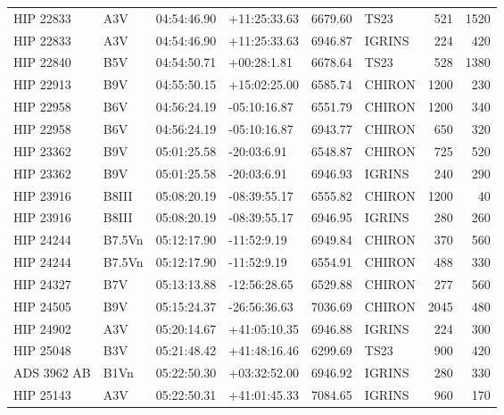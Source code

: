 \documentclass{emulateapj}
\begin{document}
\begin{longtable*}{|l|lllrlrr|}
   HIP 22833 &            A3V &    04:54:46.90 &   +11:25:33.63 &  6679.60 &       TS23 &      521 &    1520 \\
   HIP 22833 &            A3V &    04:54:46.90 &   +11:25:33.63 &  6946.87 &     IGRINS &      224 &     420 \\
   HIP 22840 &            B5V &    04:54:50.71 &    +00:28:1.81 &  6678.64 &       TS23 &      528 &    1380 \\
   HIP 22913 &            B9V &    04:55:50.15 &   +15:02:25.00 &  6585.74 &     CHIRON &     1200 &     230 \\
   HIP 22958 &            B6V &    04:56:24.19 &   -05:10:16.87 &  6551.79 &     CHIRON &     1200 &     340 \\
   HIP 22958 &            B6V &    04:56:24.19 &   -05:10:16.87 &  6943.77 &     CHIRON &      650 &     320 \\
   HIP 23362 &            B9V &    05:01:25.58 &    -20:03:6.91 &  6548.87 &     CHIRON &      725 &     520 \\
   HIP 23362 &            B9V &    05:01:25.58 &    -20:03:6.91 &  6946.93 &     IGRINS &      240 &     290 \\
   HIP 23916 &          B8III &    05:08:20.19 &   -08:39:55.17 &  6555.82 &     CHIRON &     1200 &      40 \\
   HIP 23916 &          B8III &    05:08:20.19 &   -08:39:55.17 &  6946.95 &     IGRINS &      280 &     260 \\
   HIP 24244 &         B7.5Vn &    05:12:17.90 &    -11:52:9.19 &  6949.84 &     CHIRON &      370 &     560 \\
   HIP 24244 &         B7.5Vn &    05:12:17.90 &    -11:52:9.19 &  6554.91 &     CHIRON &      488 &     330 \\
   HIP 24327 &            B7V &    05:13:13.88 &   -12:56:28.65 &  6529.88 &     CHIRON &      277 &     560 \\
   HIP 24505 &            B9V &    05:15:24.37 &   -26:56:36.63 &  7036.69 &     CHIRON &     2045 &     480 \\
   HIP 24902 &            A3V &    05:20:14.67 &   +41:05:10.35 &  6946.88 &     IGRINS &      224 &     300 \\
   HIP 25048 &            B3V &    05:21:48.42 &   +41:48:16.46 &  6299.69 &       TS23 &      900 &     420 \\
 ADS 3962 AB &           B1Vn &    05:22:50.30 &   +03:32:52.00 &  6946.92 &     IGRINS &      280 &     330 \\
   HIP 25143 &            A3V &    05:22:50.31 &   +41:01:45.33 &  7084.65 &     IGRINS &      960 &     170 \\

\end{longtable*}
\end{document}
